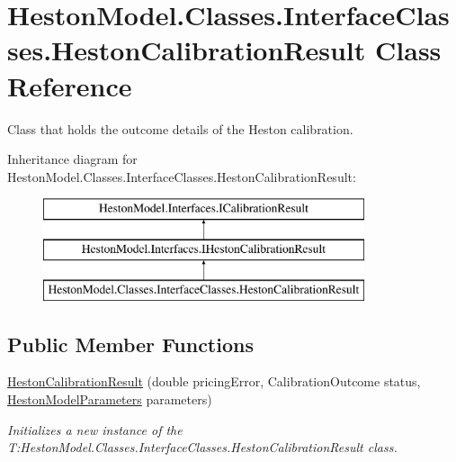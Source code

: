 \hypertarget{class_heston_model_1_1_classes_1_1_interface_classes_1_1_heston_calibration_result}{}\section{Heston\+Model.\+Classes.\+Interface\+Classes.\+Heston\+Calibration\+Result Class Reference}
\label{class_heston_model_1_1_classes_1_1_interface_classes_1_1_heston_calibration_result}


Class that holds the outcome details of the Heston calibration.  


Inheritance diagram for Heston\+Model.\+Classes.\+Interface\+Classes.\+Heston\+Calibration\+Result\+:\begin{figure}[H]
\begin{center}
\leavevmode
\includegraphics[height=3.000000cm]{class_heston_model_1_1_classes_1_1_interface_classes_1_1_heston_calibration_result}
\end{center}
\end{figure}
\subsection*{Public Member Functions}
\begin{DoxyCompactItemize}
\item 
\mbox{\hyperlink{class_heston_model_1_1_classes_1_1_interface_classes_1_1_heston_calibration_result_a1043fa3cee8817a36a6636c7f0af51e5}{Heston\+Calibration\+Result}} (double pricing\+Error, Calibration\+Outcome status, \mbox{\hyperlink{class_heston_model_1_1_classes_1_1_interface_classes_1_1_heston_model_parameters}{Heston\+Model\+Parameters}} parameters)
\begin{DoxyCompactList}\small\item\em Initializes a new instance of the T\+:\+Heston\+Model.\+Classes.\+Interface\+Classes.\+Heston\+Calibration\+Result class. \end{DoxyCompactList}\end{DoxyCompactItemize}
